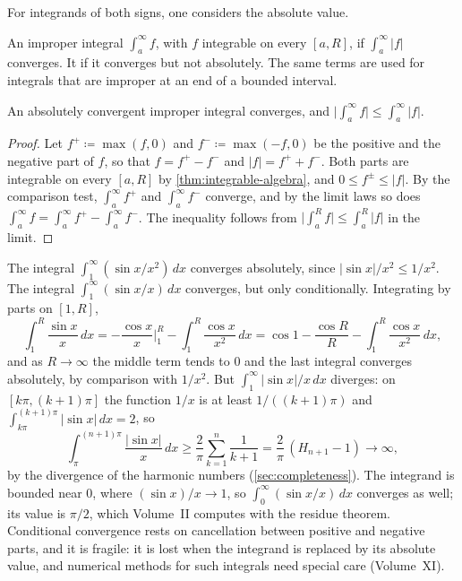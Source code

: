 For integrands of both signs, one considers the absolute value.

\begin{definition}
\label{def:absolute-convergence}
An improper integral $\int_a^\infty f$, with $f$ integrable on every $[a,R]$,  if $\int_a^\infty|f|$ converges. It  if it converges but not absolutely. The same terms are used for integrals that are improper at an end of a bounded interval.
\end{definition}

\begin{theorem}
\label{thm:absolute-convergence}
An absolutely convergent improper integral converges, and $\bigl|\int_a^\infty f\bigr|\le\int_a^\infty|f|$.
\end{theorem}

\begin{proof}
Let $f^+\coloneqq\max(f,0)$ and $f^-\coloneqq\max(-f,0)$ be the positive and the negative part of $f$, so that $f=f^+-f^-$ and $|f|=f^++f^-$. Both parts are integrable on every $[a,R]$ by \cref{thm:integrable-algebra}, and $0\le f^\pm\le|f|$. By the comparison test, $\int_a^\infty f^+$ and $\int_a^\infty f^-$ converge, and by the limit laws so does $\int_a^\infty f=\int_a^\infty f^+-\int_a^\infty f^-$. The inequality follows from $\bigl|\int_a^Rf\bigr|\le\int_a^R|f|$ in the limit.
\end{proof}

The integral $\int_1^\infty(\sin x/x^2)\,dx$ converges absolutely, since $|\sin x|/x^2\le1/x^2$. The integral $\int_1^\infty(\sin x/x)\,dx$ converges, but only conditionally. Integrating by parts on $[1,R]$,
\[
\int_1^R\frac{\sin x}x\,dx=-\frac{\cos x}x\Big|_1^R-\int_1^R\frac{\cos x}{x^2}\,dx=\cos1-\frac{\cos R}R-\int_1^R\frac{\cos x}{x^2}\,dx ,
\]
and as $R\to\infty$ the middle term tends to $0$ and the last integral converges absolutely, by comparison with $1/x^2$. But $\int_1^\infty|\sin x|/x\,dx$ diverges: on $[k\pi,(k+1)\pi]$ the function $1/x$ is at least $1/((k+1)\pi)$ and $\int_{k\pi}^{(k+1)\pi}|\sin x|\,dx=2$, so
\[
\int_\pi^{(n+1)\pi}\frac{|\sin x|}x\,dx\ge\frac2\pi\sum_{k=1}^n\frac1{k+1}=\frac2\pi\,(H_{n+1}-1)\to\infty ,
\]
by the divergence of the harmonic numbers (\cref{sec:completeness}). The integrand is bounded near $0$, where $(\sin x)/x\to1$, so $\int_0^\infty(\sin x/x)\,dx$ converges as well; its value is $\pi/2$, which Volume~II computes with the residue theorem. Conditional convergence rests on cancellation between positive and negative parts, and it is fragile: it is lost when the integrand is replaced by its absolute value, and numerical methods for such integrals need special care (Volume~XI).

